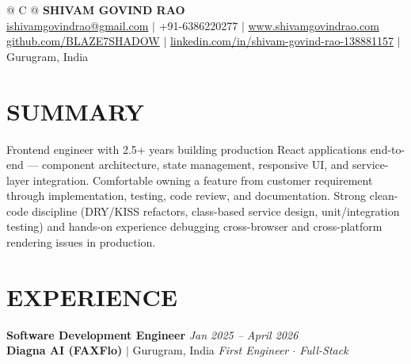 \documentclass[a4paper,10pt]{article}
\begin{document}
\pagestyle{empty}

\begin{tabularx}{\linewidth}{@{} C @{}}
\Huge{\textbf{SHIVAM GOVIND RAO}} \\[6pt]
\normalsize{\href{mailto:ishivamgovindrao@gmail.com}{ishivamgovindrao@gmail.com} $|$ +91-6386220277 $|$ \href{https://www.shivamgovindrao.com}{www.shivamgovindrao.com}} \\
\normalsize{\href{https://github.com/BLAZE7SHADOW}{github.com/BLAZE7SHADOW} $|$ \href{https://www.linkedin.com/in/shivam-govind-rao-138881157/}{linkedin.com/in/shivam-govind-rao-138881157} $|$ Gurugram, India}
\end{tabularx}

\vspace{3pt}

\section{SUMMARY}

Frontend engineer with 2.5+ years building production React applications end-to-end --- component architecture, state management, responsive UI, and service-layer integration. Comfortable owning a feature from customer requirement through implementation, testing, code review, and documentation. Strong clean-code discipline (DRY/KISS refactors, class-based service design, unit/integration testing) and hands-on experience debugging cross-browser and cross-platform rendering issues in production.

\section{EXPERIENCE}

\textbf{Software Development Engineer} \hfill \textit{Jan 2025 -- April 2026}\\
\textbf{Diagna AI (FAXFlo)} $|$ Gurugram, India \hfill \textit{First Engineer $\cdot$ Full-Stack}
\end{document}
